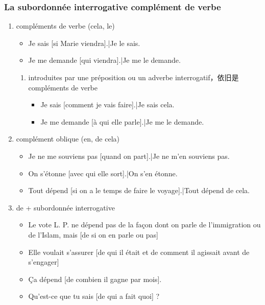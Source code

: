 \documentclass[UTF8]{report}
\begin{document}
\subsubsection{La subordonnée interrogative complément de verbe}

\begin{enumerate}
    \item compléments de verbe (cela, le)
    \begin{itemize}
        \item Je sais [si Marie viendra].|Je le sais.
        \item  Je me demande [qui viendra].|Je me le demande.
    \end{itemize}
    \begin{enumerate}
        \item introduites par une préposition ou un adverbe interrogatif，依旧是compléments de verbe
        \begin{itemize}
            \item Je sais [comment je vais faire].|Je sais cela.
            \item Je me demande [à qui elle parle].|Je me le demande.
        \end{itemize}
    \end{enumerate}
    \item complément oblique (en, de cela)
    \begin{itemize}
        \item Je ne me souviens pas [quand on part].|Je ne m’en souviens pas.
        \item On s’étonne [avec qui elle sort].|On s’en étonne.
        \item Tout dépend [si on a le temps de faire le voyage].|Tout dépend de cela.
    \end{itemize}
    \item de + subordonnée interrogative
    \begin{itemize}
        \item Le vote L. P. ne dépend pas de la façon dont on parle de l’immigration ou de l’Islam, mais [de si on en parle ou pas]
        \item Elle voulait s’assurer [de qui il était et de comment il agissait avant de s’engager]
        \item Ça dépend [de combien il gagne par mois].
        \item Qu’est-ce que tu sais [de qui a fait quoi] ? 
    \end{itemize}
\end{enumerate}
\end{document}
